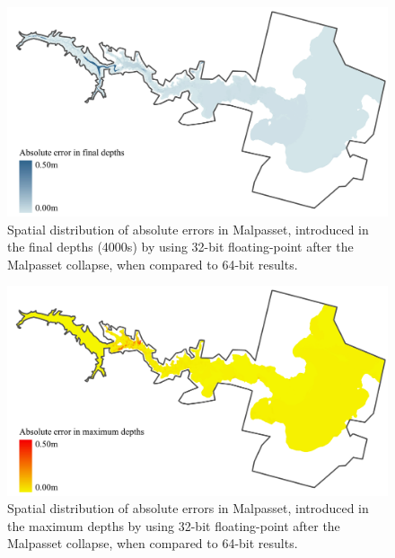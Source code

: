 \begin{figure}[p]
	\centering
	\includegraphics[width=1.0\textwidth]{heterogeneous-dev-figures/Figure_11_Colour.jpg}
	\caption{Spatial distribution of absolute errors in Malpasset, introduced in the final depths (4000s) by using 32-bit floating-point after the Malpasset collapse, when compared to 64-bit results.}
	\label{FPErrorFinal}
\end{figure}
\begin{figure}[p]
	\centering
	\includegraphics[width=1.0\textwidth]{heterogeneous-dev-figures/Figure_12_Colour.jpg}
	\caption{Spatial distribution of absolute errors in Malpasset, introduced in the maximum depths by using 32-bit floating-point after the Malpasset collapse, when compared to 64-bit results.}
	\label{FPErrorMax}
\end{figure}

